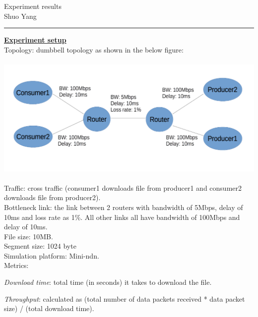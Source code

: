 \documentclass[10pt]{article}
\begin{document}
\noindent


\begin{center}
  Experiment results\\
  Shuo Yang\\
  \vspace{1em}
\end{center}

\hrule\smallskip
\vspace{1em}
\underline{\textbf{Experiment setup}}\\

Topology: dumbbell topology as shown in the below figure:

\begin{center}
  \includegraphics[width=14cm,height=6cm]{./dumbbell.png}
\end{center}

Traffic: cross traffic (consumer1 downloads file from producer1 and
consumer2 downloads file from producer2).\\

Bottleneck link: the link between 2 routers with bandwidth of 5Mbps,
delay of 10ms and loss rate as 1\%. All other links all have bandwidth
of 100Mbps and delay of 10ms.\\

File size: 10MB.\\

Segment size: 1024 byte\\

Simulation platform: Mini-ndn.\\

Metrics:

\emph{Download time}: total time (in seconds) it takes to download the file.

\emph{Throughput}: calculated as (total number of data packets received *
data packet size) / (total download time).
\end{document}
